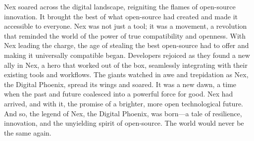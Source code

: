 Nex soared across the digital landscape, reigniting the flames of open-source innovation.
It brought the best of what open-source had created and made it accessible to everyone.
Nex was not just a tool; it was a movement, a revolution that reminded the world of the power of true compatibility and openness.
With Nex leading the charge, the age of stealing the best open-source had to offer and making it universally compatible began.
Developers rejoiced as they found a new ally in Nex, a hero that worked out of the box, seamlessly integrating with their existing tools and workflows.
The giants watched in awe and trepidation as Nex, the Digital Phoenix, spread its wings and soared.
It was a new dawn, a time when the past and future coalesced into a powerful force for good.
Nex had arrived, and with it, the promise of a brighter, more open technological future.
And so, the legend of Nex, the Digital Phoenix, was born—a tale of resilience, innovation, and the unyielding spirit of open-source.
The world would never be the same again.
